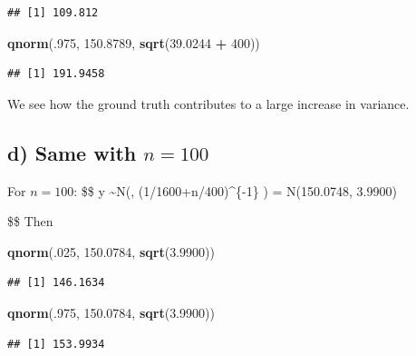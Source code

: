 \documentclass[]{article}
\newenvironment{Shaded}{\begin{snugshade}}{\end{snugshade}}
\newcommand{\KeywordTok}[1]{\textcolor[rgb]{0.13,0.29,0.53}{\textbf{#1}}}
\newcommand{\DecValTok}[1]{\textcolor[rgb]{0.00,0.00,0.81}{#1}}
\newcommand{\FloatTok}[1]{\textcolor[rgb]{0.00,0.00,0.81}{#1}}
\newcommand{\StringTok}[1]{\textcolor[rgb]{0.31,0.60,0.02}{#1}}
\newcommand{\OperatorTok}[1]{\textcolor[rgb]{0.81,0.36,0.00}{\textbf{#1}}}
\newcommand{\NormalTok}[1]{#1}
\begin{document}
\begin{verbatim}
## [1] 109.812
\end{verbatim}

\begin{Shaded}
\begin{Highlighting}[]
\KeywordTok{qnorm}\NormalTok{(.}\DecValTok{975}\NormalTok{, }\FloatTok{150.8789}\NormalTok{, }\KeywordTok{sqrt}\NormalTok{(}\FloatTok{39.0244} \OperatorTok{+}\StringTok{ }\DecValTok{400}\NormalTok{))}
\end{Highlighting}
\end{Shaded}

\begin{verbatim}
## [1] 191.9458
\end{verbatim}

We see how the ground truth contributes to a large increase in variance.

\subsection{\texorpdfstring{d) Same with
\(n=100\)}{d) Same with n=100}}\label{d-same-with-n100}

For \(n=100\): \$\$ \theta\textbar{}y
\sim N\bigg(,
(1/1600+n/400)\^{}\{-1\} \bigg) = N(150.0748, 3.9900)

\$\$ Then

\begin{Shaded}
\begin{Highlighting}[]
\KeywordTok{qnorm}\NormalTok{(.}\DecValTok{025}\NormalTok{, }\FloatTok{150.0784}\NormalTok{, }\KeywordTok{sqrt}\NormalTok{(}\FloatTok{3.9900}\NormalTok{))}
\end{Highlighting}
\end{Shaded}

\begin{verbatim}
## [1] 146.1634
\end{verbatim}

\begin{Shaded}
\begin{Highlighting}[]
\KeywordTok{qnorm}\NormalTok{(.}\DecValTok{975}\NormalTok{, }\FloatTok{150.0784}\NormalTok{, }\KeywordTok{sqrt}\NormalTok{(}\FloatTok{3.9900}\NormalTok{))}
\end{Highlighting}
\end{Shaded}

\begin{verbatim}
## [1] 153.9934
\end{verbatim}
\end{document}
